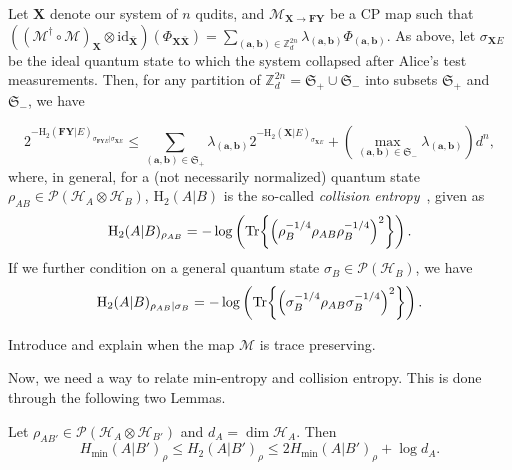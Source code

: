 \begin{lemma} 
\label{thm:entaglementSamplingResult}
Let $\mathbf{X}$ denote our system of  $n$ qudits, and  $\mathcal{M}_{\mathbf{X}\rightarrow \mathbf{F}\mathbf{Y}}$ be a CP map such that $((\mathcal{M}^\dagger \circ \mathcal{M})_{\mathbf{X}}\otimes \text{id}_{\bar{\mathbf{X}}})(\Phi_{\mathbf{X}\bar{\mathbf{X}}}) = \sum_{(\bm{a},\bm{b})\in\mathbb{Z}^{2n}_d} \lambda_{(\bm{a},\bm{b})} \Phi_{(\bm{a},\bm{b})}$. As above, let $\sigma_{\mathbf{X} E}$ be the ideal quantum state to which the system collapsed after Alice's test measurements.  Then, for any partition of $\mathbb{Z}^{2n}_d = \mathfrak{S}_+ \cup \mathfrak{S}_-$ into subsets $\mathfrak{S}_+$ and $\mathfrak{S}_-$, we have 

\begin{equation}
    2^{-\text{H}_2(\mathbf{F}\mathbf{Y} | E)_{\sigma_{\mathbf{F}\mathbf{Y}E} | \sigma_{\mathbf{X}E}}} \leq \sum_{(\bm{a},\bm{b})\in\mathfrak{S}_+} \lambda_{(\bm{a},\bm{b})} 2^{-\text{H}_2(\mathbf{X} | E)_{\sigma_{\mathbf{X}E}}} + (\max_{(\bm{a},\bm{b})\in\mathfrak{S}_-} \lambda_{(\bm{a},\bm{b})}) d^n,
\end{equation}
 where, in general, for a (not necessarily normalized) quantum state $\rho_{AB}\in \mathcal{P}(\mathcal{H}_A\otimes\mathcal{H}_B)$, $\text{H}_2(A|B)$   is the so-called \textit{collision entropy}~\cite{R06}, given as 
\begin{equation*} 
    \text{H}_2(A|B)_{\rho_{AB}}=-\log \left(\Tr{\left(\rho_{B}^{-1/4}\rho_{AB}\rho_B^{-1/4}\right)^2}\right).
\end{equation*}
If we further condition on a general quantum state $\sigma_B\in\mathcal{P}(\mathcal{H}_B)$, we have 
\begin{equation*}
    \text{H}_2(A|B)_{\rho_{AB}|\sigma_B}=-\log \left(\Tr{\left(\sigma_{B}^{-1/4}\rho_{AB}\sigma_B^{-1/4}\right)^2}\right).
\end{equation*}
\end{lemma}

Introduce and explain when the map $\mathcal{M}$ is trace preserving.

Now, we need a way to relate min-entropy and collision entropy. This is done through the following two Lemmas.

\begin{lemma}
Let $\rho_{A B'}\in\mathcal{P}(\mathcal{H}_A \otimes \mathcal{H}_{B'})$ and $d_A = \dim\mathcal{H}_A$. Then
$$H_{\min}(A|B')_{\rho} \leq H_2(A|B')_{\rho} \leq 2 H_{\min}(A|B')_{\rho} + \log d_A.$$
\end{lemma}

